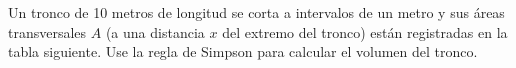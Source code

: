 \item Un tronco de 10 metros de longitud se corta a intervalos de un metro y sus áreas transversales $A$ (a una distancia $x$ del extremo del tronco) están registradas en la tabla siguiente. Use la regla de Simpson para calcular el volumen del tronco.
